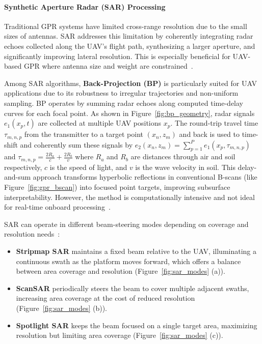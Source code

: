 

\paragraph{Synthetic Aperture Radar (SAR) Processing}

Traditional GPR systems have limited cross-range resolution due to the small sizes of antennas. SAR addresses this limitation by coherently integrating radar echoes collected along the UAV’s flight path, synthesizing a larger aperture, and significantly improving lateral resolution. This is especially beneficial for UAV-based GPR where antenna size and weight are constrained~\cite{alqudsi2021review}.

Among SAR algorithms, \textbf{Back-Projection (BP)} is particularly suited for UAV applications due to its robustness to irregular trajectories and non-uniform sampling. BP operates by summing radar echoes along computed time-delay curves for each focal point. As shown in Figure~\ref{fig:bp_geometry}, radar signals $e_1(x_p, t)$ are collected at multiple UAV positions $x_p$. The round-trip travel time $\tau_{m,n,p}$ from the transmitter to a target point $(x_n, z_m)$ and back is used to time-shift and coherently sum these signals by \(e_2(x_n, z_m) = \sum_{p=1}^{P} e_1(x_p, \tau_{m,n,p})\) and \(\tau_{m,n,p} = \frac{2R_a}{c} + \frac{2R_b}{v}\) where $R_a$ and $R_b$ are distances through air and soil respectively, $c$ is the speed of light, and $v$ is the wave velocity in soil. This delay-and-sum approach transforms hyperbolic reflections in conventional B-scans (like Figure~\ref{fig:gpr_bscan}) into focused point targets, improving subsurface interpretability. However, the method is computationally intensive and not ideal for real-time onboard processing~\cite{lei2014multi}.

SAR can operate in different beam-steering modes depending on coverage and resolution needs~\cite{moreira2013tutorial}:

\begin{itemize}
    \item \textbf{Stripmap SAR} maintains a fixed beam relative to the UAV, illuminating a continuous swath as the platform moves forward, which offers a balance between area coverage and resolution (Figure~\ref{fig:sar_modes} (a)).
    \item \textbf{ScanSAR} periodically steers the beam to cover multiple adjacent swaths, increasing area coverage at the cost of reduced resolution (Figure~\ref{fig:sar_modes} (b)).
    \item \textbf{Spotlight SAR} keeps the beam focused on a single target area, maximizing resolution but limiting area coverage (Figure~\ref{fig:sar_modes} (c)).
\end{itemize}

